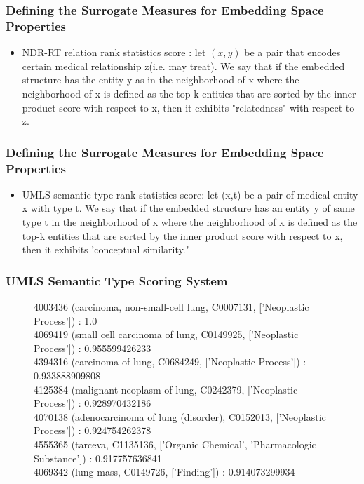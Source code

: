 \documentclass{beamer}
\begin{document}
\begin{frame}
\frametitle{Defining the Surrogate Measures for Embedding Space Properties}
\begin{itemize}
\item NDR-RT relation rank statistics score : let $(x,y)$ be a pair that encodes certain medical relationship
z(i.e. may treat). We say that if the embedded structure has the entity y as in the neighborhood of
x where the neighborhood of x is defined as
the top-k entities that are sorted by the inner product score with respect to x,
then it exhibits "relatedness" with respect to z.
\end{itemize}
\end{frame}
\begin{frame}
\frametitle{Defining the Surrogate Measures for Embedding Space Properties}
\begin{itemize}
\item
UMLS semantic type rank statistics score: let (x,t) be a pair of medical entity x with type t.
We say that if the embedded structure has an entity y of same type t in the neighborhood of x where the neighborhood of x is defined as the top-k entities that are sorted by the inner product score with respect to x, then it exhibits 'conceptual similarity."
\end{itemize}
\end{frame}


\begin{frame}
\frametitle{UMLS Semantic Type Scoring System}
\begin{footnotesize}
\begin{figure}[htb]
4003436 (carcinoma, non-small-cell lung, C0007131,  ['Neoplastic Process']) : 1.0 \\
4069419 (small cell carcinoma of lung, C0149925,  ['Neoplastic Process']) : 0.955599426233 \\
4394316 (carcinoma of lung, C0684249,  ['Neoplastic Process']) : 0.933888909808 \\
4125384 (malignant neoplasm of lung, C0242379,  ['Neoplastic Process']) : 0.928970432186 \\
4070138 (adenocarcinoma of lung (disorder), C0152013,  ['Neoplastic Process']) : 0.924754262378 \\
4555365 (tarceva, C1135136,  ['Organic Chemical', 'Pharmacologic Substance']) : 0.917757636841 \\
4069342 (lung mass, C0149726,  ['Finding']) : 0.914073299934 \\
\end{figure}
\end{footnotesize}
\end{frame}
\end{document}
